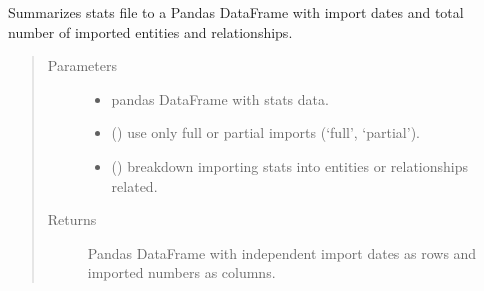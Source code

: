 \documentclass[letterpaper,10pt,english]{sphinxmanual}
\begin{document}

\begin{fulllineitems}
\label{\detokenize{_autosummary/report_manager.apps:report_manager.apps.imports.get_totals_per_date}}
Summarizes stats file to a Pandas DataFrame with import dates and total number of     imported entities and relationships.
\begin{quote}\begin{description}
\item[{Parameters}] \leavevmode\begin{itemize}
\item {} 
 \textendash{} pandas DataFrame with stats data.

\item {} 
 () \textendash{} use only full or partial imports (‘full’, ‘partial’).

\item {} 
 () \textendash{} breakdown importing stats into entities or relationships related.

\end{itemize}

\item[{Returns}] \leavevmode
Pandas DataFrame with independent import dates as rows and imported numbers as columns.

\end{description}\end{quote}

\end{fulllineitems}

\end{document}
